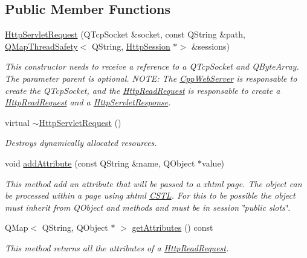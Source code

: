 \subsection*{Public Member Functions}
\begin{DoxyCompactItemize}
\item 
\hyperlink{class_http_servlet_request_acda91961621ef7bcd0fe061d0612bc2c}{Http\+Servlet\+Request} (Q\+Tcp\+Socket \&socket, const Q\+String \&path, \hyperlink{class_q_map_thread_safety}{Q\+Map\+Thread\+Safety}$<$ Q\+String, \hyperlink{class_http_session}{Http\+Session} $\ast$$>$ \&sessions)
\begin{DoxyCompactList}\small\item\em This constructor needs to receive a reference to a Q\+Tcp\+Socket and Q\+Byte\+Array. The parameter parent is optional. N\+O\+TE\+: The \hyperlink{class_cpp_web_server}{Cpp\+Web\+Server} is responsable to create the Q\+Tcp\+Socket, and the \hyperlink{class_http_read_request}{Http\+Read\+Request} is responsable to create a \hyperlink{class_http_read_request}{Http\+Read\+Request} and a \hyperlink{class_http_servlet_response}{Http\+Servlet\+Response}. \end{DoxyCompactList}\item 
virtual \hyperlink{class_http_servlet_request_aa3ed01e89a6d5390e61c0b0f3e6f83c2}{$\sim$\+Http\+Servlet\+Request} ()
\begin{DoxyCompactList}\small\item\em Destroys dynamically allocated resources. \end{DoxyCompactList}\item 
void \hyperlink{class_http_servlet_request_a2537c9716161ea25d83e2aea5b26a945}{add\+Attribute} (const Q\+String \&name, Q\+Object $\ast$value)
\begin{DoxyCompactList}\small\item\em This method add an attribute that will be passed to a xhtml page. The object can be processed within a page using xhtml \hyperlink{namespace_c_s_t_l}{C\+S\+TL}. For this to be possible the object must inherit from Q\+Object and methods and must be in session \char`\"{}public slots\char`\"{}. \end{DoxyCompactList}\item 
Q\+Map$<$ Q\+String, Q\+Object $\ast$ $>$ \hyperlink{class_http_servlet_request_add50206d719a748a2162610fd30f060e}{get\+Attributes} () const
\begin{DoxyCompactList}\small\item\em This method returns all the attributes of a \hyperlink{class_http_read_request}{Http\+Read\+Request}. \end{DoxyCompactList}\item 
$$
\end{DoxyCompactItemize}
